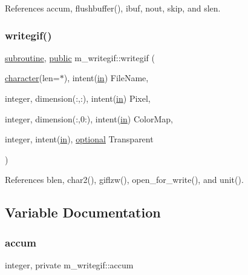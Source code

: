 References accum, flushbuffer(), ibuf, nout, skip, and slen.

\mbox{\label{namespacem__writegif_a02be37849028b2f9484cff1b4285375d}} 
\subsubsection{\texorpdfstring{writegif()}{writegif()}}
{\footnotesize\ttfamily \hyperlink{M__stopwatch_83_8txt_acfbcff50169d691ff02d4a123ed70482}{subroutine}, \hyperlink{M__stopwatch_83_8txt_a2f74811300c361e53b430611a7d1769f}{public} m\+\_\+writegif\+::writegif (\begin{DoxyParamCaption}\item[{\hyperlink{option__stopwatch_83_8txt_abd4b21fbbd175834027b5224bfe97e66}{character}(len=$\ast$), intent(\hyperlink{M__journal_83_8txt_afce72651d1eed785a2132bee863b2f38}{in})}]{File\+Name,  }\item[{integer, dimension(\+:,\+:), intent(\hyperlink{M__journal_83_8txt_afce72651d1eed785a2132bee863b2f38}{in})}]{Pixel,  }\item[{integer, dimension(\+:,0\+:), intent(\hyperlink{M__journal_83_8txt_afce72651d1eed785a2132bee863b2f38}{in})}]{Color\+Map,  }\item[{integer, intent(\hyperlink{M__journal_83_8txt_afce72651d1eed785a2132bee863b2f38}{in}), \hyperlink{option__stopwatch_83_8txt_aa4ece75e7acf58a4843f70fe18c3ade5}{optional}}]{Transparent }\end{DoxyParamCaption})}



References blen, char2(), giflzw(), open\+\_\+for\+\_\+write(), and unit().



\subsection{Variable Documentation}
\mbox{\label{namespacem__writegif_a2a80a14e30c6ed2b0003d46a93480531}} 
\subsubsection{\texorpdfstring{accum}{accum}}
{\footnotesize\ttfamily integer, private m\+\_\+writegif\+::accum\hspace{0.3cm}{\ttfamily [private]}}

